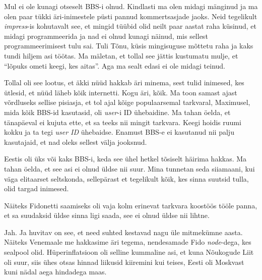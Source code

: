 
Mul ei ole kunagi otseselt BBS-i olnud. Kindlasti ma olen midagi mänginud ja ma olen paar tükki  äri-inimestele püsti pannud  kommertsasjade jaoks. Neid tegelikult \emph{impress}-is kohutavalt see, et  mingid tüübid olid neilt paar aastat raha küsinud, et midagi programmeerida ja nad ei olnud kunagi näinud, mis sellest programmeerimisest tulu sai.  Tuli Tõnu, küsis mingisuguse mõttetu raha ja kaks tundi hiljem asi töötas. Ma mäletan, et tollal see jättis kustumatu mulje, et \enquote{lõpuks ometi keegi, kes aitas}. Aga ma sealt edasi ei ole midagi teinud. 


Tollal oli see lootus, et äkki nüüd hakkab äri minema, sest tulid inimesed, kes ütlesid, et nüüd läheb kõik internetti. Kogu äri, kõik. Ma toon samast ajast võrdluseks sellise pisiasja, et  tol ajal kõige populaarsemal tarkvaral, Maximusel, mida kõik BBS-id kasutasid, oli \emph{user}-i  ID  ühebaidine. Ma tahan öelda, et tänapäeval  ei kujuta ette, et sa teeks nii mingit tarkvara. Keegi hoidis ruumi kokku ja ta tegi \emph{user ID} ühebaidse. Enamust BBS-e ei kasutanud nii palju kasutajaid, et nad oleks sellest välja jooksnud. 


Eestis oli üks või kaks BBS-i, keda see ühel hetkel tõsiselt häirima hakkas. Ma tahan öelda, et see asi ei olnud üldse nii suur. Mina tunnetan seda siiamaani, kui väga elitaarset seltskonda, sellepärast et tegelikult kõik, kes sinna suutsid tulla, olid targad inimesed. 

Näiteks Fidonetti saamiseks oli vaja kolm erinevat tarkvara koostöös tööle panna, et sa suudaksid üldse sinna ligi saada, see ei olnud üldse nii lihtne. 


Jah. Ja huvitav on see, et need suhted kestavad nagu üle mitmekümne aasta. Näiteks Venemaale me hakkasime äri tegema, nendesamade Fido \emph{node}-dega, kes sealpool olid. Hüperinflatsioon oli selline kummaline asi, et kuna Nõukogude Liit oli suur, siis ühes otsas hinnad liikusid kiiremini kui teises, Eesti oli Moskvast kuni nädal aega hindadega maas. 


